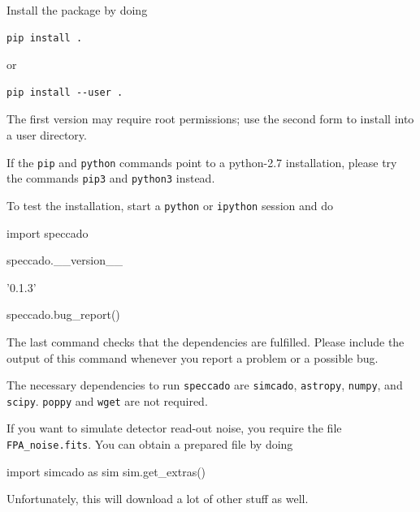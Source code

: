 \documentclass[a4paper,twoside,11pt]{article}
\begin{document}
Install the package by doing
\begin{lstlisting}[style=csh]
pip install .
\end{lstlisting}
or
\begin{lstlisting}[style=csh]
pip install --user .
\end{lstlisting}
The first version may require root permissions; use the second form to
install into a user directory.

If the \lstinline{pip} and \lstinline{python} commands point to a
python-2.7 installation, please try the commands \lstinline{pip3} and
\lstinline{python3} instead.

To test the installation, start a \lstinline{python} or
\lstinline{ipython} session and do
\begin{pyin}
  import speccado
\end{pyin}

\begin{pyin}
speccado.__version__
\end{pyin}
\begin{pyout}
'0.1.3'
\end{pyout}
\begin{pyin}
speccado.bug_report()
\end{pyin}

The last command checks that the dependencies are fulfilled. Please
include the output of this command whenever you report a problem or a
possible bug.

The necessary dependencies to run \lstinline{speccado} are
\lstinline{simcado}, \lstinline{astropy}, \lstinline{numpy}, and
\lstinline{scipy}. \lstinline{poppy} and \lstinline{wget} are not
required.

If you want to simulate detector read-out noise, you require the file
\lstinline{FPA_noise.fits}. You can obtain a prepared file by doing
\begin{pyin}
import simcado as sim
sim.get_extras()
\end{pyin}
Unfortunately, this will download a lot of other stuff as well.
\end{document}
